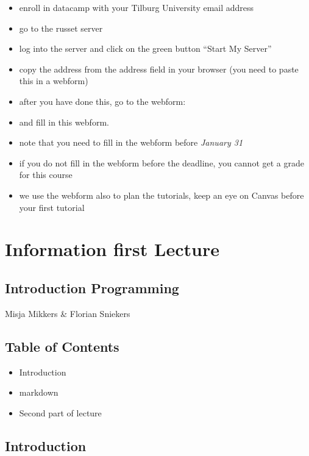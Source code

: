 \documentclass[]{book}
\providecommand{\tightlist}{%
  \setlength{\itemsep}{0pt}\setlength{\parskip}{0pt}}
\begin{document}
\begin{itemize}
\tightlist
\item
  enroll in datacamp with your Tilburg University email address
\item
  go to the russet server
\item
  log into the server and click on the green button ``Start My Server''
\item
  copy the address from the address field in your browser (you need to paste this in a webform)
\item
  after you have done this, go to the webform:
\item
  and fill in this webform.
\item
  note that you need to fill in the webform before \emph{January 31}
\item
  if you do not fill in the webform before the deadline, you cannot get a grade for this course
\item
  we use the webform also to plan the tutorials, keep an eye on Canvas before your first tutorial
\end{itemize}

\hypertarget{information-first-lecture}{%
\chapter{Information first Lecture}\label{information-first-lecture}}

\hypertarget{introduction-programming}{%
\section{Introduction Programming}\label{introduction-programming}}

Misja Mikkers \& Florian Sniekers

\hypertarget{table-of-contents}{%
\section{Table of Contents}\label{table-of-contents}}

\begin{itemize}
\item
  Introduction
\item
  markdown
\item
  Second part of lecture
\end{itemize}

\hypertarget{introduction}{%
\section{Introduction}\label{introduction}}
\end{document}
